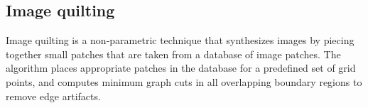 


\subsection{Image quilting}


Image quilting \citep{efros2001quilting} is a non-parametric technique that synthesizes images by piecing together small patches that are taken from a database of image patches. The algorithm places appropriate patches in the database for a predefined set of grid points, and computes minimum graph cuts \citep{boykov2001graphcuts} in all overlapping boundary regions to remove edge artifacts.

